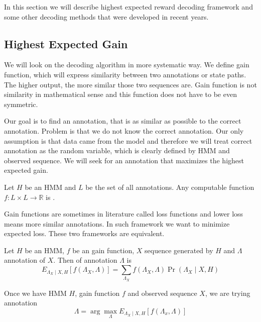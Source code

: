 In this section we will describe highest expected reward decoding framework and
some other decoding methods that were developed in recent years.

\subsection{Highest Expected Gain}

We will look on the decoding algorithm in more systematic way. We define gain
function, which will express similarity between
two annotations or state paths. The higher output, the more
similar those two sequences are. Gain function is not similarity in mathematical
sense and this function does not have to be even symmetric. 

Our goal is to find an annotation, that is as similar as possible to the correct
annotation. Problem is that we do not know the correct annotation. Our only
assumption is that data came from the model and therefore we will treat correct
annotation as the random variable, which is clearly defined by HMM and observed
sequence. We will seek for an annotation that maximizes the highest expected
gain.

\begin{definition}
Let $H$ be an HMM and $L$ be the set of all annotations. Any computable function
$f:L\times L\to \mathbb{R}$ is .
\end{definition}

\begin{note}
Gain functions are sometimes in literature called loss functions and lower loss
means more similar annotations. In such framework we want to minimize expected
loss. These two frameworks are equivalent.
\end{note}

\begin{definition}
Let $H$ be an HMM, $f$ be an gain function, $X$ sequence generated by $H$ and
$\Lambda$ annotation of $X$. Then  of annotation
$\Lambda$ is 
\begin{equation}
E_{\Lambda_X\mid X,H}[f(\Lambda_X,\Lambda)] =
\sum_{\Lambda_X}f(\Lambda_X,\Lambda)\Pr\left(\Lambda_X\mid X,H\right)
\end{equation}
\end{definition}


Once we have HMM $H$, gain function $f$ and observed sequence $X$,
we are trying annotation
\begin{equation}
\Lambda = \arg\max_{\Lambda}E_{\Lambda_X\mid
X,H}\left[f\left(\Lambda_x,\Lambda\right)\right]
\end{equation}

